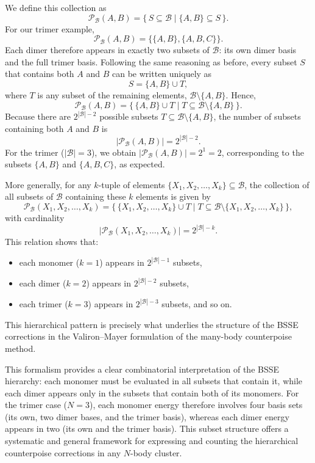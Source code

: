 \noindent
We define this collection as
\[
\mathcal{P}_{\mathcal{B}}(A,B)
   = \{\, S \subseteq \mathcal{B} \mid \{A,B\} \subseteq S \,\}.
\]
For our trimer example,
\[
\mathcal{P}_{\mathcal{B}}(A,B)
   = \{\{A,B\}, \{A,B,C\}\}.
\]
Each dimer therefore appears in exactly two subsets of \(\mathcal{B}\):
its own dimer basis and the full trimer basis. Following the same reasoning as before,
every subset \(S\) that contains both \(A\) and \(B\)
can be written uniquely as
\[
S = \{A,B\} \cup T,
\]
where \(T\) is any subset of the remaining elements,
\(\mathcal{B}\setminus\{A,B\}\).
Hence,
\[
\boxed{
\mathcal{P}_{\mathcal{B}}(A,B)
   = \bigl\{\, \{A,B\} \cup T
     \;\big|\;
     T\subseteq\mathcal{B}\setminus\{A,B\}\,\bigr\}.
}
\]
Because there are \(2^{|\mathcal{B}|-2}\) possible subsets
\(T\subseteq\mathcal{B}\setminus\{A,B\}\),
the number of subsets containing both \(A\) and \(B\) is
\[
|\mathcal{P}_{\mathcal{B}}(A,B)| = 2^{|\mathcal{B}|-2}.
\]
For the trimer (\(|\mathcal{B}|=3\)),
we obtain \( |\mathcal{P}_{\mathcal{B}}(A,B)| = 2^{1} = 2\),
corresponding to the subsets
\(\{A,B\}\) and \(\{A,B,C\}\),
as expected.

\noindent
More generally, for any \(k\)-tuple of elements
\(\{X_1, X_2, \ldots, X_k\}\subseteq\mathcal{B}\),
the collection of all subsets of \(\mathcal{B}\) containing these \(k\) elements
is given by
\clearpage
\[
\boxed{
\mathcal{P}_{\mathcal{B}}(X_1,X_2,\ldots,X_k)
   = \bigl\{\, \{X_1,X_2,\ldots,X_k\} \cup T
     \;\big|\;
     T\subseteq\mathcal{B}\setminus\{X_1,X_2,\ldots,X_k\}\,\bigr\},
}
\]
with cardinality
\begin{equation}
|\mathcal{P}_{\mathcal{B}}(X_1,X_2,\ldots,X_k)|
   = 2^{|\mathcal{B}|-k}.
\label{eq:equation-14}
\end{equation}
This relation shows that:
\begin{itemize}[topsep=-0.25cm]
    \item each monomer (\(k=1\)) appears in \(2^{|\mathcal{B}|-1}\) subsets,
    \item each dimer (\(k=2\)) appears in \(2^{|\mathcal{B}|-2}\) subsets,
    \item each trimer (\(k=3\)) appears in \(2^{|\mathcal{B}|-3}\) subsets, and so on.
\end{itemize}
This hierarchical pattern is precisely what underlies
the structure of the BSSE corrections
in the Valiron--Mayer formulation of the many-body counterpoise method.



\noindent
This formalism provides a clear combinatorial interpretation
of the BSSE hierarchy:
each monomer must be evaluated in all subsets
that contain it,
while each dimer appears only in the subsets
that contain both of its monomers.
For the trimer case (\(N=3\)),
each monomer energy therefore involves
four basis sets
(its own, two dimer bases, and the trimer basis),
whereas each dimer energy appears in two
(its own and the trimer basis).
This subset structure offers a systematic and general framework
for expressing and counting the hierarchical counterpoise corrections
in any \(N\)-body cluster.

